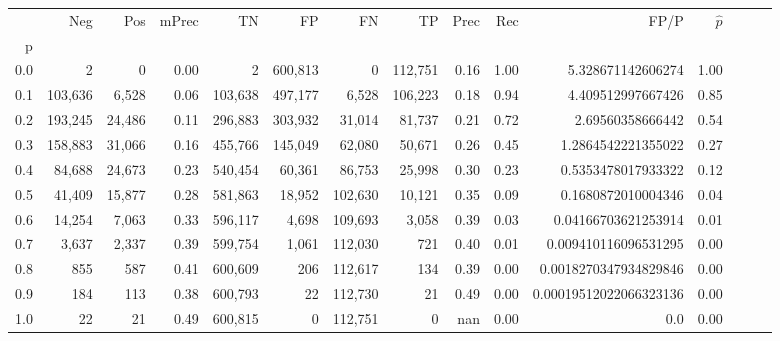 \begin{tabular}{rrrrrrrrrrrrrrr}
\toprule
{} &      Neg &     Pos & mPrec &       TN &       FP &       FN &       TP &  Prec &   Rec &                    FP/P & $\hat{p}$ \\
p   &          &         &       &          &          &          &          &       &       &                         &           \\
\midrule
0.0 &        2 &       0 &  0.00 &        2 &  600,813 &        0 &  112,751 &  0.16 &  1.00 &       5.328671142606274 &      1.00 \\
0.1 &  103,636 &   6,528 &  0.06 &  103,638 &  497,177 &    6,528 &  106,223 &  0.18 &  0.94 &       4.409512997667426 &      0.85 \\
0.2 &  193,245 &  24,486 &  0.11 &  296,883 &  303,932 &   31,014 &   81,737 &  0.21 &  0.72 &        2.69560358666442 &      0.54 \\
0.3 &  158,883 &  31,066 &  0.16 &  455,766 &  145,049 &   62,080 &   50,671 &  0.26 &  0.45 &      1.2864542221355022 &      0.27 \\
0.4 &   84,688 &  24,673 &  0.23 &  540,454 &   60,361 &   86,753 &   25,998 &  0.30 &  0.23 &      0.5353478017933322 &      0.12 \\
0.5 &   41,409 &  15,877 &  0.28 &  581,863 &   18,952 &  102,630 &   10,121 &  0.35 &  0.09 &      0.1680872010004346 &      0.04 \\
0.6 &   14,254 &   7,063 &  0.33 &  596,117 &    4,698 &  109,693 &    3,058 &  0.39 &  0.03 &     0.04166703621253914 &      0.01 \\
0.7 &    3,637 &   2,337 &  0.39 &  599,754 &    1,061 &  112,030 &      721 &  0.40 &  0.01 &    0.009410116096531295 &      0.00 \\
0.8 &      855 &     587 &  0.41 &  600,609 &      206 &  112,617 &      134 &  0.39 &  0.00 &   0.0018270347934829846 &      0.00 \\
0.9 &      184 &     113 &  0.38 &  600,793 &       22 &  112,730 &       21 &  0.49 &  0.00 &  0.00019512022066323136 &      0.00 \\
1.0 &       22 &      21 &  0.49 &  600,815 &        0 &  112,751 &        0 &   nan &  0.00 &                     0.0 &      0.00 \\
\bottomrule
\end{tabular}

